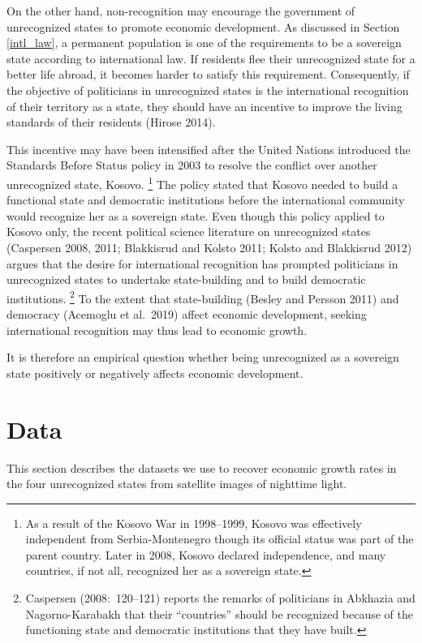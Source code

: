 \documentclass[12pt,a4paper]{article}%
\begin{document}
On the other hand, non-recognition may encourage the government of unrecognized states to promote economic development. 
As discussed in Section \ref{intl_law}, a permanent population is one of the requirements to be a sovereign state according to international law.
If residents flee their unrecognized state for a better life abroad, it becomes harder to satisfy this requirement.
Consequently, if the objective of politicians in unrecognized states is the international recognition of their territory as a state, they should have an incentive to improve the living standards of their residents (Hirose 2014). 

This incentive may have been intensified after the United Nations introduced the Standards Before Status policy in 2003 to resolve the conflict over another unrecognized state, Kosovo.%
\footnote{
	As a result of the Kosovo War in 1998--1999, Kosovo was effectively independent from Serbia-Montenegro though its official status was part of the parent country.
	Later in 2008, Kosovo declared independence, and many countries, if not all, recognized her as a sovereign state. 
} 
The policy stated that Kosovo needed to build a functional state and democratic institutions before the international community would recognize her as a sovereign state.
Even though this policy applied to Kosovo only, the recent political science literature on unrecognized states (Caspersen 2008, 2011; Blakkisrud and Kolsto 2011; Kolsto and Blakkisrud 2012) argues that the desire for international recognition has prompted politicians in unrecognized states to undertake state-building and to build democratic institutions.%
\footnote{
	Caspersen (2008:\ 120--121) reports the remarks of politicians in Abkhazia and Nagorno-Karabakh that their ``countries'' should be recognized because of the functioning state and democratic institutions that they have built.
	}
To the extent that state-building (Besley and Persson 2011) and democracy (Acemoglu et al.\ 2019) affect economic development, seeking international recognition may thus lead to economic growth.

It is therefore an empirical question whether being unrecognized as a sovereign state positively or negatively affects economic development.	

\section{Data}\label{data}
This section describes the datasets we use to recover economic growth rates in the four unrecognized states from satellite images of nighttime light.
\end{document}
